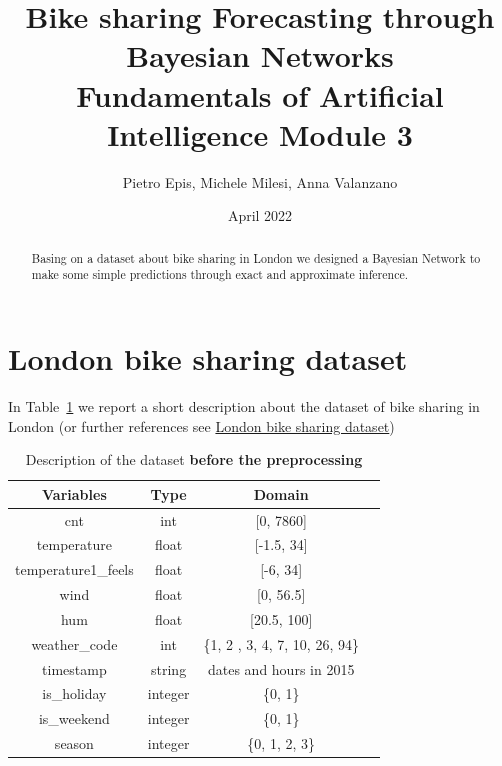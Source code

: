 \documentclass[letterpaper,11pt]{article}
\begin{document}
\title{%
  Bike sharing Forecasting through Bayesian Networks \\
  \vspace{0.5cm}
  \large Fundamentals of Artificial Intelligence 
    Module 3}
\author{Pietro Epis, Michele Milesi, Anna Valanzano}
\date{April 2022}
\maketitle

\begin{abstract}
Basing on a dataset about bike sharing in London we designed a Bayesian Network to make some simple predictions through exact and approximate inference.
\end{abstract}

\section{London bike sharing dataset}
In Table~\ref{tab:t1} we report a short description about the dataset of bike sharing in London (or further references see 
\href{https://www.kaggle.com/datasets/hmavrodiev/london-bike-sharing-dataset}{London bike sharing dataset})
\begin{table}[h]
\begin{center}
\begin{tabular}{cccc} 
\hline
\multicolumn{1}{c}{Variables} & \multicolumn{1}{c}{Type}& \multicolumn{1}{c}{Domain }\\
\hline
cnt &   int  &  [0, 7860]\\
temperature &   float & [-1.5, 34]\\
temperature1\_feels & float  & [-6, 34]\\
wind & float & [0, 56.5]\\
hum & float  & [20.5, 100]\\
weather\_code & int &  \{1, 2 , 3, 4, 7, 10, 26, 94\}\\
timestamp & string & dates and hours in 2015 \\
is\_holiday  & integer  &\{0, 1\} \\
is\_weekend  & integer  &\{0, 1\} \\
season & integer &\{0, 1, 2, 3\} \\
\hline
\end{tabular}
\caption{Description of the dataset \textbf{before the preprocessing}}
\label{tab:t1} 
\end{center}
\end{table}\\
\end{document}
